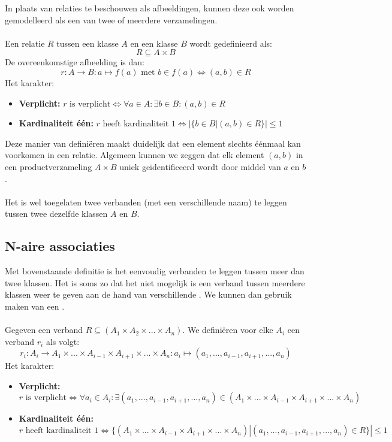 \documentclass[../main.tex]{subfiles}
\begin{document}
In plaats van relaties te beschouwen als afbeeldingen, kunnen deze ook worden gemodelleerd als een  van twee of meerdere verzamelingen.\\
\\
Een relatie $R$ tussen een klasse $A$ en een klasse $B$ wordt gedefinieerd als:
\begin{equation*}
\boxed{R \subseteq A \times B}
\end{equation*}
De overeenkomstige afbeelding is dan:
\begin{equation*}
\boxed{r:A \rightarrow B: a \mapsto f(a) \textrm{ met } b \in f(a) \Leftrightarrow (a,b) \in R}
\end{equation*}
Het karakter:
\begin{itemize}
	\item \textbf{Verplicht:} $r \textrm{ is verplicht} \Leftrightarrow \forall a \in A: \exists b \in B: (a,b) \in R$
	\item \textbf{Kardinaliteit \'e\'en:} $r \textrm{ heeft kardinaliteit 1} \Leftrightarrow |\{ b \in B | (a,b) \in R \}| \leq 1$
\end{itemize}
Deze manier van defini\"eren maakt duidelijk dat een element slechts \'e\'enmaal kan voorkomen in een relatie. Algemeen kunnen we zeggen dat elk element $(a,b)$ in een productverzameling $A \times B$ uniek ge\"identificeerd wordt door middel van $a$ en $b$. \\
\\
Het is wel toegelaten twee verbanden (met een verschillende naam) te leggen tussen twee dezelfde klassen $A$ en $B$.
\subsection{N-aire associaties}
Met bovenstaande definitie is het eenvoudig verbanden te leggen tussen meer dan twee klassen. Het is soms zo dat het niet mogelijk is een verband tussen meerdere klassen weer te geven aan de hand van  verschillende . We kunnen dan gebruik maken van een . \\
\\
Gegeven een verband $R \subseteq (A_1 \times A_2 \times ... \times A_n)$. We defini\"eren voor elke $A_i$ een verband $r_i$ als volgt:
\begin{equation*}
\boxed{r_i : A_i \rightarrow A_1 \times ... \times A_{i-1} \times A_{i+1} \times ... \times A_n: a_i \mapsto (a_1, ... , a_{i-1}, a_{i+1} , ... , a_n) }
\end{equation*}
Het karakter:
\begin{itemize}
	\item \textbf{Verplicht:} \\
	$r \textrm{ is verplicht} \Leftrightarrow \forall a_i \in A_i: \exists  (a_1, ... , a_{i-1}, a_{i+1} , ... , a_n) \in (A_1 \times ... \times A_{i-1} \times A_{i+1} \times ... \times A_n)$
	\item \textbf{Kardinaliteit \'e\'en:} \\
	 $r \textrm{ heeft kardinaliteit 1} \Leftrightarrow \{ (A_1 \times ... \times A_{i-1} \times A_{i+1} \times ... \times A_n) | (a_1, ... , a_{i-1}, a_{i+1} , ... , a_n) \in R \}| \leq 1$
\end{itemize}
\end{document}
